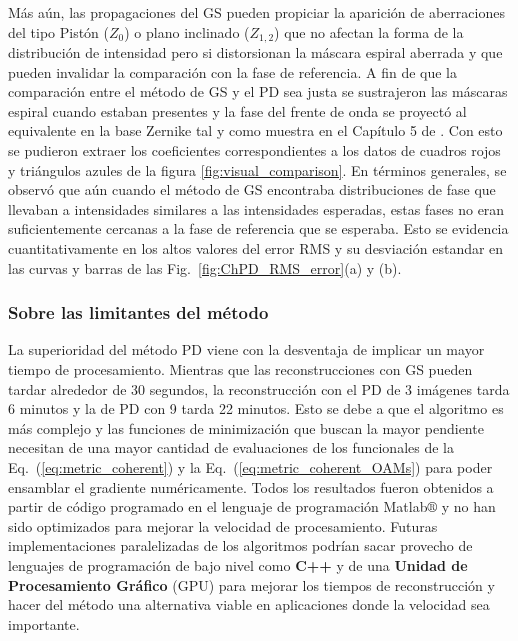 Más aún, las propagaciones del GS pueden propiciar la aparición de
aberraciones del tipo Pistón ($Z_0$) o plano inclinado
($Z_{1,2}$) que no afectan la forma de la distribución de intensidad
pero si distorsionan la máscara espiral aberrada y que 
pueden invalidar la comparación con la fase de referencia. 
A fin de que la comparación entre el método de GS y el PD sea justa se
sustrajeron las máscaras espiral cuando estaban presentes y la fase
del frente de onda se proyectó al equivalente en la  base Zernike tal
y como muestra en el Capítulo 5 de . Con esto
se pudieron extraer los coeficientes correspondientes a los datos de
cuadros rojos y triángulos azules de la figura
\ref{fig:visual_comparison}. 
En términos generales, se observó que aún cuando el método de GS
encontraba distribuciones de fase que llevaban a intensidades
similares a las intensidades esperadas, estas fases no eran
suficientemente cercanas a la fase de referencia que se esperaba. Esto
se evidencia cuantitativamente en los altos valores del error RMS y su
desviación estandar en las curvas y barras de las
Fig.~\ref{fig:ChPD_RMS_error}(a) y (b).


\subsubsection{Sobre las limitantes del método}
La superioridad del método PD viene con la desventaja de implicar un
mayor tiempo de procesamiento. Mientras que las reconstrucciones con
GS pueden tardar alrededor de 30 segundos, la reconstrucción con el PD
de 3 imágenes tarda 6 minutos y la de PD con 9 tarda 22 minutos. Esto
se debe a que el algoritmo es más complejo y las funciones de
minimización que buscan la mayor pendiente necesitan de una mayor cantidad
de evaluaciones de los funcionales de la
Eq.~(\ref{eq:metric_coherent}) y la
Eq.~(\ref{eq:metric_coherent_OAMs}) para poder ensamblar el gradiente 
numéricamente. Todos los resultados fueron obtenidos a partir de
código programado en el lenguaje de programación Matlab$\circledR$ y
no han sido optimizados para mejorar la velocidad de
procesamiento. Futuras implementaciones paralelizadas de los
algoritmos podrían sacar provecho de lenguajes de programación de bajo
nivel como \textbf{C++} y de una \textbf{Unidad de Procesamiento Gráfico} (\acrshort{GPU})
para mejorar los tiempos de reconstrucción y hacer del método una
alternativa viable en aplicaciones donde la velocidad sea importante. 

